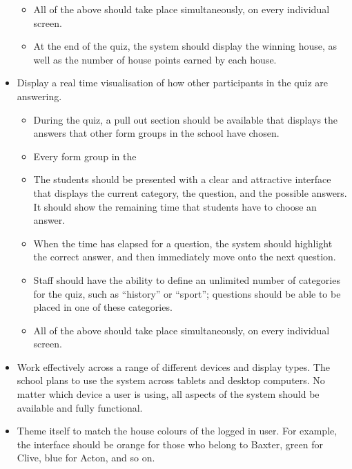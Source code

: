\begin{itemize}
\begin{itemize}
			\item All of the above should take place simultaneously, on every individual screen.
			
			\item At the end of the quiz, the system should display the winning house, as well as the number of house points earned by each house.
		\end{itemize}

	\item Display a real time visualisation of how other participants in the quiz are answering.

		\begin{itemize}
			\item During the quiz, a pull out section should be available that displays the answers that other form groups in the school have chosen.

			\item Every form group in the 

			\item The students should be presented with a clear and attractive interface that displays the current category, the question, and the possible answers. It should show the remaining time that students have to choose an answer.

			\item When the time has elapsed for a question, the system should highlight the correct answer, and then immediately move onto the next question.

			\item Staff should have the ability to define an unlimited number of categories for the quiz, such as ``history'' or ``sport''; questions should be able to be placed in one of these categories.

			\item All of the above should take place simultaneously, on every individual screen.
		\end{itemize}

	\item Work effectively across a range of different devices and display types. The school plans to use the system across tablets and desktop computers. No matter which device a user is using, all aspects of the system should be available and fully functional.

	\item Theme itself to match the house colours of the logged in user. For example, the interface should be orange for those who belong to Baxter, green for Clive, blue for Acton, and so on.
\end{itemize}
